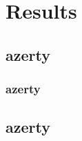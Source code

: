 \documentclass[../main.tex]{subfiles}
\begin{document}
\chapter{Results}

\section{azerty}

\subsection{azerty}

\lipsum

\section{azerty}

\lipsum[4]
\end{document}
